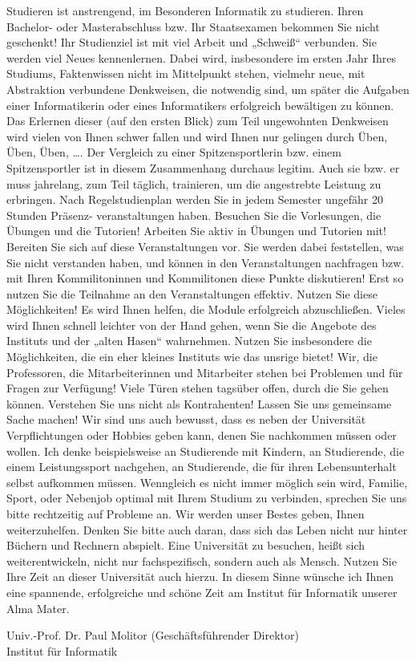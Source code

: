 Studieren ist anstrengend, im Besonderen Informatik zu studieren. Ihren Bachelor- oder Masterabschluss bzw. Ihr Staatsexamen bekommen Sie nicht geschenkt! Ihr Studienziel ist mit viel Arbeit und „Schweiß“ verbunden. Sie werden viel Neues kennenlernen. Dabei wird, insbesondere im ersten Jahr Ihres Studiums, Faktenwissen nicht im Mittelpunkt stehen, vielmehr neue, mit Abstraktion verbundene Denkweisen, die notwendig sind, um später die Aufgaben einer Informatikerin oder eines Informatikers erfolgreich bewältigen zu können. Das Erlernen dieser (auf den ersten Blick) zum Teil ungewohnten Denkweisen wird vielen von Ihnen schwer fallen und wird Ihnen nur gelingen durch Üben, Üben, Üben, …. Der Vergleich zu einer Spitzensportlerin bzw. einem Spitzensportler ist in diesem Zusammenhang durchaus legitim. Auch sie bzw. er muss jahrelang, zum Teil täglich, trainieren, um die angestrebte Leistung zu erbringen. 
Nach Regelstudienplan werden Sie in jedem Semester ungefähr 20 Stunden Präsenz-
veranstaltungen haben. Besuchen Sie die Vorlesungen, die Übungen und die Tutorien! Arbeiten Sie aktiv in Übungen und Tutorien mit! Bereiten Sie sich auf diese Veranstaltungen vor. Sie werden dabei feststellen, was Sie nicht verstanden haben, und können in den Veranstaltungen nachfragen bzw. mit Ihren Kommilitoninnen und Kommilitonen diese Punkte diskutieren! Erst so nutzen Sie die Teilnahme an den Veranstaltungen effektiv. Nutzen Sie diese Möglichkeiten! Es wird Ihnen helfen, die Module erfolgreich abzuschließen.
Vieles wird Ihnen schnell leichter von der Hand gehen, wenn Sie die Angebote des Instituts und der „alten Hasen“ wahrnehmen. Nutzen Sie insbesondere die Möglichkeiten, die ein eher kleines Instituts wie das unsrige bietet! Wir, die Professoren, die Mitarbeiterinnen und Mitarbeiter stehen bei Problemen und für Fragen zur Verfügung! Viele Türen stehen tagsüber offen, durch die Sie gehen können. Verstehen Sie uns nicht als Kontrahenten! Lassen Sie uns gemeinsame Sache machen! 
Wir sind uns auch bewusst, dass es neben der Universität Verpflichtungen oder Hobbies geben kann, denen Sie nachkommen müssen oder wollen. Ich denke beispielsweise an Studierende mit Kindern, an Studierende, die einem Leistungssport nachgehen, an Studierende, die für  ihren Lebensunterhalt selbst aufkommen müssen. Wenngleich es nicht immer möglich sein wird, Familie, Sport, oder Nebenjob optimal mit Ihrem Studium zu verbinden, sprechen Sie uns bitte rechtzeitig auf Probleme an. Wir werden unser Bestes geben, Ihnen weiterzuhelfen.
Denken Sie bitte auch daran, dass sich das Leben nicht nur hinter Büchern und Rechnern abspielt. Eine Universität zu besuchen, heißt sich weiterentwickeln, nicht nur fachspezifisch, sondern auch als Mensch. Nutzen Sie Ihre Zeit an dieser Universität auch hierzu.
In diesem Sinne wünsche ich Ihnen eine spannende, erfolgreiche und schöne Zeit am Institut für Informatik unserer Alma Mater.

Univ.-Prof. Dr. Paul Molitor (Geschäftsführender Direktor)\\
Institut für Informatik


